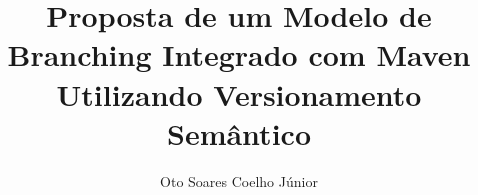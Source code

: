 \documentclass[]{scrartcl}
\title{Proposta de um Modelo de Branching Integrado com Maven Utilizando Versionamento Semântico}
\author{Oto Soares Coelho Júnior}
\begin{document}
\maketitle

%





{}

\end{document}

